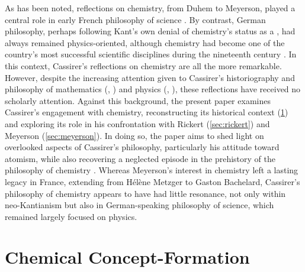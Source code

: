 \documentclass[submitted,12pt]{article}
\begin{document}
As has been noted, reflections on chemistry, from Duhem to Meyerson, played a central role in early French philosophy of science \citep{Bensaude-Vincent2009a}. By contrast, German philosophy, perhaps following Kant's own denial of chemistry's status as a , had always remained physics-oriented, although chemistry had become one of the country's most successful scientific disciplines during the nineteenth century \citep{Rocke2021}. In this context, Cassirer's reflections on chemistry are all the more remarkable. However, despite the increasing attention given to Cassirer's historiography and philosophy of mathematics (\cite{Schiemer2018}, \cite{Reck2020}) and physics (\cite{Ryckman2005}, \cite{French2014}), these reflections have received no scholarly attention. Against this background, the present paper examines Cassirer's engagement with chemistry, reconstructing its historical context (\cref{sec:chemistry}) and exploring its role in his confrontation with Rickert (\cref{sec:rickert}) and Meyerson (\cref{sec:meyerson}). In doing so, the paper aims to shed light on overlooked aspects of Cassirer’s philosophy, particularly his attitude toward atomism, while also recovering a neglected episode in the prehistory of the philosophy of chemistry \citep{VanBrakel2012}. Whereas Meyerson's interest in chemistry left a lasting legacy in France, extending from H{\'e}l{\`e}ne Metzger to Gaston Bachelard, Cassirer's philosophy of chemistry appears to have had little resonance, not only within neo-Kantianism but also in German-speaking philosophy of science, which remained largely focused on physics.

\section{Chemical Concept-Formation}
\label{sec:chemistry}
\end{document}
